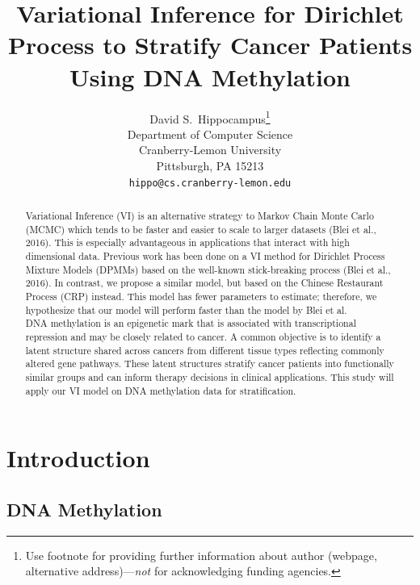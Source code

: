 \documentclass{article}
\title{Variational Inference for Dirichlet Process to Stratify Cancer
Patients Using DNA Methylation}
\author{%
  David S.~Hippocampus\thanks{Use footnote for providing further information
    about author (webpage, alternative address)---\emph{not} for acknowledging
    funding agencies.} \\
  Department of Computer Science\\
  Cranberry-Lemon University\\
  Pittsburgh, PA 15213 \\
  \texttt{hippo@cs.cranberry-lemon.edu} \\
}
\begin{document}
\maketitle

\begin{abstract}
Variational Inference (VI) is an alternative strategy to Markov Chain Monte Carlo (MCMC) which tends to be faster and easier to scale to larger datasets (Blei et al., 2016). This is especially advantageous in applications that interact with high dimensional data. Previous work has been done on a VI method for Dirichlet Process Mixture Models (DPMMs) based on the well-known stick-breaking process (Blei et al., 2016). In contrast, we propose a similar model, but based on the Chinese Restaurant Process (CRP) instead. This model has fewer parameters to estimate; therefore, we hypothesize that our model will perform faster than the model by Blei et al.
\\

DNA methylation is an epigenetic mark that is associated with transcriptional repression and may be closely related to cancer. A common objective is to identify a latent structure shared across cancers from different tissue types reflecting commonly altered gene pathways. These latent structures stratify cancer patients into functionally similar groups and can inform therapy decisions in clinical applications. This study will apply our VI model on DNA methylation data for stratification.  
\end{abstract}

\section{Introduction}


\subsection{DNA Methylation}
\end{document}
